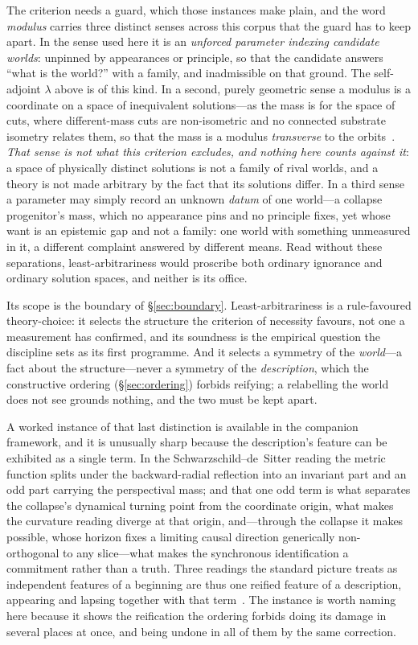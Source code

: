 \documentclass[11pt,a4paper]{article}
\begin{document}
The criterion needs a guard, which those instances make plain, and the word \emph{modulus} carries three distinct senses across this corpus that the guard has to keep apart. In the sense used here it is an \emph{unforced parameter indexing candidate worlds}: unpinned by appearances or principle, so that the candidate answers ``what is the world?'' with a family, and inadmissible on that ground. The self-adjoint $\lambda$ above is of this kind. In a second, purely geometric sense a modulus is a coordinate on a space of inequivalent solutions---as the mass is for the space of cuts, where different-mass cuts are non-isometric and no connected substrate isometry relates them, so that the mass is a modulus \emph{transverse} to the orbits~\cite{JanzenAlgebroid}. \emph{That sense is not what this criterion excludes, and nothing here counts against it}: a space of physically distinct solutions is not a family of rival worlds, and a theory is not made arbitrary by the fact that its solutions differ. In a third sense a parameter may simply record an unknown \emph{datum} of one world---a collapse progenitor's mass, which no appearance pins and no principle fixes, yet whose want is an epistemic gap and not a family: one world with something unmeasured in it, a different complaint answered by different means. Read without these separations, least-arbitrariness would proscribe both ordinary ignorance and ordinary solution spaces, and neither is its office.

Its scope is the boundary of \S\ref{sec:boundary}. Least-arbitrariness is a rule-favoured theory-choice: it selects the structure the criterion of necessity favours, not one a measurement has confirmed, and its soundness is the empirical question the discipline sets as its first programme. And it selects a symmetry of the \emph{world}---a fact about the structure---never a symmetry of the \emph{description}, which the constructive ordering (\S\ref{sec:ordering}) forbids reifying; a relabelling the world does not see grounds nothing, and the two must be kept apart.

A worked instance of that last distinction is available in the companion framework, and it is unusually sharp because the description's feature can be exhibited as a single term. In the Schwarzschild--de~Sitter reading the metric function splits under the backward-radial reflection into an invariant part and an odd part carrying the perspectival mass; and that one odd term is what separates the collapse's dynamical turning point from the coordinate origin, what makes the curvature reading diverge at that origin, and---through the collapse it makes possible, whose horizon fixes a limiting causal direction generically non-orthogonal to any slice---what makes the synchronous identification a commitment rather than a truth. Three readings the standard picture treats as independent features of a beginning are thus one reified feature of a description, appearing and lapsing together with that term~\cite{JanzenCRframework}. The instance is worth naming here because it shows the reification the ordering forbids doing its damage in several places at once, and being undone in all of them by the same correction.
\end{document}
